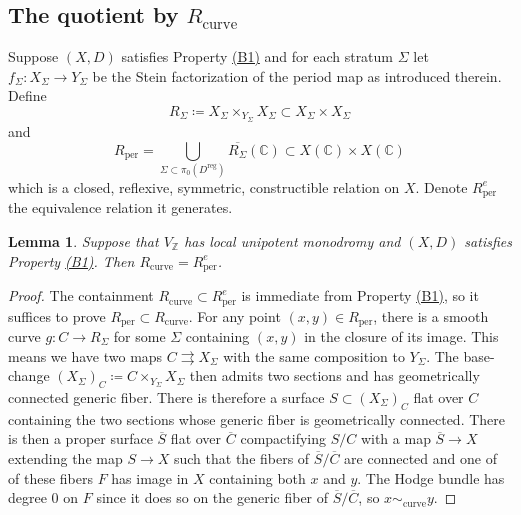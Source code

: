 \documentclass{amsart}
\newcommand{\customref}[2]{\hyperref[#1]{#2}}
\newcommand{\ol}{\overline}
\newtheorem{lem}[theorem]{Lemma}
\theoremstyle{definition}
\theoremstyle{remark}
\def\bZ{\mathbb{Z}}
\def\bC{\mathbb{C}}
\def\reg{\mathrm{reg}}
\def\curve{\mathrm{curve}}
\renewcommand{\bar}[1]{\ol{#1}}
\numberwithin{equation}{section}
\begin{document}

 
\subsection{The quotient by $R_\curve$}\label{subsect:R_per}
Suppose $(X,D)$ satisfies Property \customref{b1}{(B1)} and for each stratum $\Sigma$ let $f_\Sigma:X_\Sigma\to Y_\Sigma$ be the Stein factorization of the period map as introduced therein.
Define
\[R_\Sigma\coloneqq  X_\Sigma\times_{Y_\Sigma} X_\Sigma\subset  X_\Sigma\times X_\Sigma\]
and 
\[R_{\mathrm{per}}=\bigcup_{\Sigma\subset\pi_0(D^\reg)}\overline{R_\Sigma}(\bC)\subset X(\bC)\times X(\bC)\]
which is a closed, reflexive, symmetric, constructible relation on $X$.  Denote $R_{\mathrm{per}}^e$ the equivalence relation it generates.


\begin{lem}\label{lem:equiv reln stuff curve}Suppose that $V_\bZ$ has local unipotent monodromy and $(X,D)$ satisfies Property \customref{b1}{(B1)}.  Then $R_\mathrm{curve}=R_\mathrm{per}^e$.
\end{lem}

\begin{proof}
The containment
$R_\mathrm{curve}\subset R^e_\mathrm{per}$ is immediate from Property \customref{b1}{(B1)}, so it suffices to prove $R_\mathrm{per}\subset R_\mathrm{curve}$.  For any point $(x,y)\in R_\mathrm{per}$, there is a smooth curve $g:C\to R_\Sigma$ for some $\Sigma$ containing $(x,y)$ in the closure of its image.  This means we have two maps $C\rightrightarrows X_\Sigma$ with the same composition to $Y_\Sigma$.  The base-change $(X_\Sigma)_C 
\coloneqq C \times_{Y_{\Sigma}} X_{\Sigma}$ then admits two sections and has geometrically connected generic fiber.  There is therefore a surface $S\subset (X_\Sigma)_C$ flat over $C$ containing the two sections whose generic fiber is geometrically connected.  There is then a proper surface $\bar S$ flat over $\bar C$ compactifying $S/C$ with a map $\bar S\to X$ extending the map $S\to X$ such that the fibers of $\bar S/\bar C$ are connected and one of of these fibers $F$ has image in $X$ containing both $x$ and $y$.  The Hodge bundle has degree 0 on $F$ since it does so on the generic fiber of $\bar S/\bar C$, so $x\sim_\mathrm{curve}y$.
\end{proof}
\end{document}
